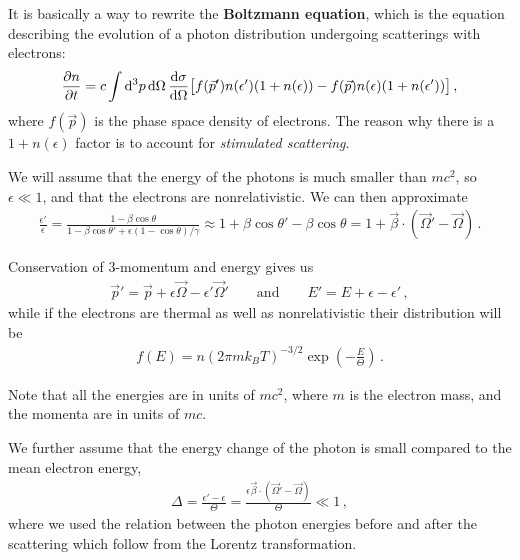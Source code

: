 \documentclass[main.tex]{subfiles}
\begin{document}
It is basically a way to rewrite the \textbf{Boltzmann equation}, which is the equation describing the evolution of a photon distribution undergoing scatterings with electrons: 
%
\begin{align}
\pdv{n}{t} = c \int \dd[3]{p} \dd{\Omega } \dv{\sigma }{\Omega } 
\qty[f(\vec{p}') n(\epsilon ') (1 + n(\epsilon )) - f(\vec{p}) n(\epsilon ) (1 + n(\epsilon '))]
\,,
\end{align}
%
where \(f(\vec{p})\) is the phase space density of electrons. 
The reason why there is a \(1 + n(\epsilon )\) factor is to account for \emph{stimulated scattering}.

We will assume that the energy of the photons is much smaller than \(mc^2\), so \(\epsilon \ll 1\), and that the electrons are nonrelativistic. We can then approximate 
%
\begin{align}
\frac{\epsilon'}{\epsilon } = \frac{1 - \beta \cos \theta }{1 - \beta \cos \theta ' + \epsilon (1 - \cos \theta ) / \gamma } \approx 1 + \beta \cos \theta ' - \beta \cos \theta = 1 + \vec{\beta} \cdot (\vec{\Omega}' - \vec{\Omega})
\,.
\end{align}

Conservation of 3-momentum and energy gives us 
%
\begin{align}
\vec{p}' = \vec{p} + \epsilon \vec{\Omega} - \epsilon ' \vec{\Omega}' 
\qquad \text{and} \qquad
E' = E + \epsilon - \epsilon '
\,,
\end{align}
%
while if the electrons are thermal as well as nonrelativistic their distribution will be 
%
\begin{align}
f(E) = n (2 \pi m k_B T)^{-3/2} \exp(- \frac{E}{\Theta }) 
\,.
\end{align}

Note that all the energies are in units of \(mc^2\), where \(m\) is the electron mass, and the momenta are in units of \(mc\). 

We further assume that the energy change of the photon is small compared to the mean electron energy, 
%
\begin{align}
\Delta = \frac{\epsilon ' - \epsilon }{\Theta } = \frac{\epsilon \vec{\beta} \cdot (\vec{\Omega}' - \vec{\Omega})}{\Theta } \ll 1 
\,,
\end{align}
%
where we used the relation between the photon energies before and after the scattering which follow from the Lorentz transformation. 
\end{document}
